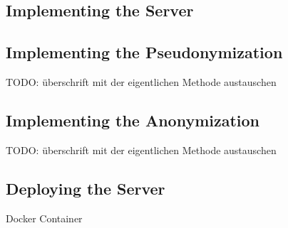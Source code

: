 \subsection{Implementing the Server}
\label{subsec:implementing_the_server}

\subsection{Implementing the Pseudonymization}
\label{subsec:implementing_the_pseudonymization}

TODO: überschrift mit der eigentlichen Methode austauschen

\subsection{Implementing the Anonymization}
\label{subsec:implementing_the_anonymization}

TODO: überschrift mit der eigentlichen Methode austauschen

\subsection{Deploying the Server}
\label{subsec:deploying_the_server}

Docker Container

